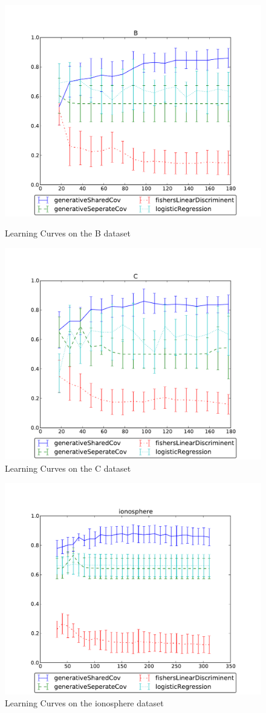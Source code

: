 \documentclass[12pt]{article}
\begin{document}
\begin{figure}[h]
\centering
\vspace{-1.5in}
\includegraphics[width=.85\textwidth]{B-learning_curve.pdf}
\caption{Learning Curves on the B dataset}
\label{fig:B}
\includegraphics[width=.85\textwidth]{C-learning_curve.pdf}
\caption{Learning Curves on the C dataset}
\label{fig:C}
\end{figure}

\begin{figure}[h]
\centering
\includegraphics[width=\textwidth]{ionosphere-learning_curve.pdf}
\caption{Learning Curves on the ionosphere dataset}
\label{fig:ionosphere}
\end{figure}
\end{document}
